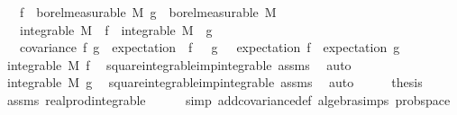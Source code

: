 \begin{isabellebody}
\ \ \ {\isachardoublequoteopen}f\ {\isasymin}\ borel{\isacharunderscore}{\kern0pt}measurable\ M{\isachardoublequoteclose}\ {\isachardoublequoteopen}g\ {\isasymin}\ borel{\isacharunderscore}{\kern0pt}measurable\ M{\isachardoublequoteclose}\isanewline
\ \ \ {\isachardoublequoteopen}integrable\ M\ {\isacharparenleft}{\kern0pt}{\isasymlambda}{\isasymomega}{\isachardot}{\kern0pt}\ f\ {\isasymomega}{\isacharcircum}{\kern0pt}{}{\isacharparenright}{\kern0pt}{\isachardoublequoteclose}\ {\isachardoublequoteopen}integrable\ M\ {\isacharparenleft}{\kern0pt}{\isasymlambda}{\isasymomega}{\isachardot}{\kern0pt}\ g\ {\isasymomega}{\isacharcircum}{\kern0pt}{}{\isacharparenright}{\kern0pt}{\isachardoublequoteclose}\isanewline
\ \ \ {\isachardoublequoteopen}covariance\ f\ g\ {\isacharequal}{\kern0pt}\ expectation\ {\isacharparenleft}{\kern0pt}{\isasymlambda}{\isasymomega}{\isachardot}{\kern0pt}\ f\ {\isasymomega}\ {\isacharasterisk}{\kern0pt}\ g\ {\isasymomega}{\isacharparenright}{\kern0pt}\ {\isacharminus}{\kern0pt}\ expectation\ f\ {\isacharasterisk}{\kern0pt}\ expectation\ g{\isachardoublequoteclose}\isanewline
%
\isadelimproof
%
\endisadelimproof
%
\isatagproof
{}\isamarkupfalse%
\ {\isacharminus}{\kern0pt}\isanewline
\ \ \isamarkupfalse%
\ {\isachardoublequoteopen}integrable\ M\ f{\isachardoublequoteclose}\ \isamarkupfalse%
\ square{\isacharunderscore}{\kern0pt}integrable{\isacharunderscore}{\kern0pt}imp{\isacharunderscore}{\kern0pt}integrable\ assms\ \isamarkupfalse%
\ auto\isanewline
\ \ \isamarkupfalse%
\ \isamarkupfalse%
\ {\isachardoublequoteopen}integrable\ M\ g{\isachardoublequoteclose}\ \isamarkupfalse%
\ square{\isacharunderscore}{\kern0pt}integrable{\isacharunderscore}{\kern0pt}imp{\isacharunderscore}{\kern0pt}integrable\ assms\ \isamarkupfalse%
\ auto\isanewline
\ \ \isamarkupfalse%
\ \isamarkupfalse%
\ {\isacharquery}{\kern0pt}thesis\isanewline
\ \ \ \ \isamarkupfalse%
\ assms\ real{\isacharunderscore}{\kern0pt}prod{\isacharunderscore}{\kern0pt}integrable\isanewline
\ \ \ \ \isamarkupfalse%
\ {\isacharparenleft}{\kern0pt}simp\ add{\isacharcolon}{\kern0pt}covariance{\isacharunderscore}{\kern0pt}def\ algebra{\isacharunderscore}{\kern0pt}simps\ prob{\isacharunderscore}{\kern0pt}space{\isacharparenright}{\kern0pt}\isanewline
{}\isamarkupfalse%
%
\endisatagproof

\end{isabellebody}
